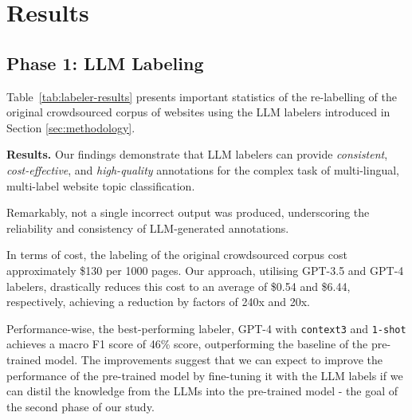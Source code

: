 \section{Results}

\subsection*{Phase 1: LLM Labeling}



Table~\ref{tab:labeler-results} presents important statistics of the re-labelling of the original crowdsourced corpus of websites using the LLM labelers introduced in Section \ref{sec:methodology}.

\textbf{Results.} Our findings demonstrate that LLM labelers can provide \textit{consistent}, \textit{cost-effective}, and \textit{high-quality} annotations for the complex task of multi-lingual, multi-label website topic classification. 

Remarkably, not a single incorrect output was produced, underscoring the reliability and consistency of LLM-generated annotations.

In terms of cost, the labeling of the original crowdsourced corpus cost approximately \$130 per 1000 pages. Our approach, utilising GPT-3.5 and GPT-4 labelers, drastically reduces this cost to an average of \$0.54 and \$6.44, respectively, achieving a reduction by factors of 240x and 20x.





Performance-wise, the best-performing labeler, GPT-4 with \texttt{context3} and \texttt{1-shot} achieves a macro F1 score of 46\% score, outperforming the baseline of the pre-trained model. The improvements suggest that we can expect to improve the performance of the pre-trained model by fine-tuning it with the LLM labels if we can distil the knowledge from the LLMs into the pre-trained model - the goal of the second phase of our study.

